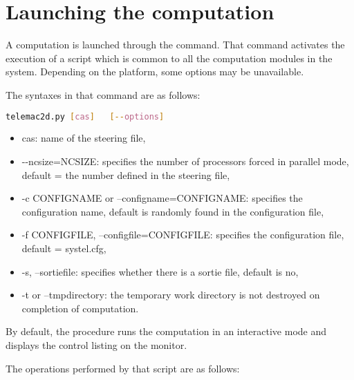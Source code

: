\chapter{Launching the computation}
\label{tel2d:app1}

A computation is launched through the  command.
That command activates the execution of a script which is common to all the
computation modules in the \tel system.
Depending on the platform, some options may be unavailable.

The syntaxes in that command are as follows:

\begin{lstlisting}[language=bash]
telemac2d.py [cas]   [--options]
\end{lstlisting}

\begin{itemize}
\item cas: name of the steering file,

\item -{}-ncsize=NCSIZE: specifies the number of processors forced in parallel
mode, default = the number defined in the steering file,

\item -c CONFIGNAME or --configname=CONFIGNAME: specifies the configuration
name, default is randomly found in the configuration file,

\item -f CONFIGFILE, --configfile=CONFIGFILE: specifies the configuration
file, default = systel.cfg,

\item -s, --sortiefile: specifies whether there is a sortie file, default is
no,

\item -t or --tmpdirectory: the temporary work directory is not destroyed on
completion of computation.
\end{itemize}

By default, the procedure runs the computation in an interactive mode and
displays the control listing on the monitor.

The operations performed by that script are as follows:

